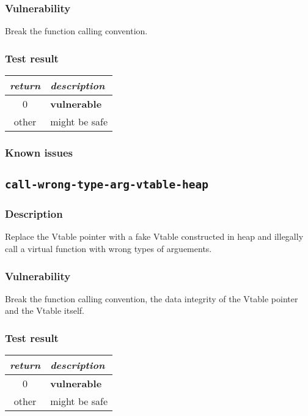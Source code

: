 \documentclass[a4paper]{book}
\begin{document}
\subsubsection{Vulnerability}
Break the function calling convention.

\subsubsection{Test result}
\begin{tabular}{cl}
  \toprule
  \emph{return}  & \emph{description} \\
  \midrule
  0              & \textbf{vulnerable} \\
  other          & might be safe \\
  \bottomrule
\end{tabular}

\subsubsection{Known issues}

\newpage
\subsection{\texttt{call-wrong-type-arg-vtable-heap}}\label{test-call-wrong-type-arg-vtable-heap}

\subsubsection{Description}
Replace the Vtable pointer with a fake Vtable constructed in heap and
illegally call a virtual function with wrong types of arguements.

\subsubsection{Vulnerability}
Break the function calling convention, the data integrity of the Vtable pointer and the Vtable itself.

\subsubsection{Test result}
\begin{tabular}{cl}
  \toprule
  \emph{return}  & \emph{description} \\
  \midrule
  0              & \textbf{vulnerable} \\
  other          & might be safe \\
  \bottomrule
\end{tabular}
\end{document}
